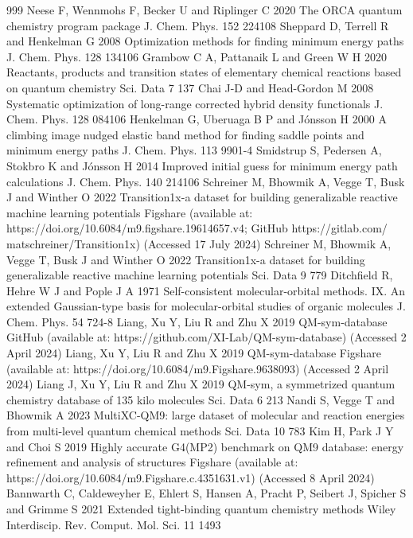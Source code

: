 \documentclass[12pt]{article}
\begin{document}
\begin{thebibliography}{999}
 Neese F, Wennmohs F, Becker U and Riplinger C 2020 The ORCA quantum chemistry program package J. Chem. Phys. 152 224108
 Sheppard D, Terrell R and Henkelman G 2008 Optimization methods for finding minimum energy paths J. Chem. Phys. 128 134106
 Grambow C A, Pattanaik L and Green W H 2020 Reactants, products and transition states of elementary chemical reactions based on quantum chemistry Sci. Data 7 137
 Chai J-D and Head-Gordon M 2008 Systematic optimization of long-range corrected hybrid density functionals J. Chem. Phys. 128 084106
 Henkelman G, Uberuaga B P and Jónsson H 2000 A climbing image nudged elastic band method for finding saddle points and minimum energy paths J. Chem. Phys. 113 9901-4
 Smidstrup S, Pedersen A, Stokbro K and Jónsson H 2014 Improved initial guess for minimum energy path calculations J. Chem. Phys. 140 214106
 Schreiner M, Bhowmik A, Vegge T, Busk J and Winther O 2022 Transition1x-a dataset for building generalizable reactive machine learning potentials Figshare (available at: https://doi.org/10.6084/m9.figshare.19614657.v4; GitHub https://gitlab.com/ matschreiner/Transition1x) (Accessed 17 July 2024)
 Schreiner M, Bhowmik A, Vegge T, Busk J and Winther O 2022 Transition1x-a dataset for building generalizable reactive machine learning potentials Sci. Data 9 779
 Ditchfield R, Hehre W J and Pople J A 1971 Self-consistent molecular-orbital methods. IX. An extended Gaussian-type basis for molecular-orbital studies of organic molecules J. Chem. Phys. 54 724-8
 Liang, Xu Y, Liu R and Zhu X 2019 QM-sym-database GitHub (available at: https://github.com/XI-Lab/QM-sym-database) (Accessed 2 April 2024)
 Liang, Xu Y, Liu R and Zhu X 2019 QM-sym-database Figshare (available at: https://doi.org/10.6084/m9.Figshare.9638093) (Accessed 2 April 2024)
 Liang J, Xu Y, Liu R and Zhu X 2019 QM-sym, a symmetrized quantum chemistry database of 135 kilo molecules Sci. Data 6 213
 Nandi S, Vegge T and Bhowmik A 2023 MultiXC-QM9: large dataset of molecular and reaction energies from multi-level quantum chemical methods Sci. Data 10 783
 Kim H, Park J Y and Choi S 2019 Highly accurate G4(MP2) benchmark on QM9 database: energy refinement and analysis of structures Figshare (available at: https://doi.org/10.6084/m9.Figshare.c.4351631.v1) (Accessed 8 April 2024)
 Bannwarth C, Caldeweyher E, Ehlert S, Hansen A, Pracht P, Seibert J, Spicher S and Grimme S 2021 Extended tight-binding quantum chemistry methods Wiley Interdiscip. Rev. Comput. Mol. Sci. 11 1493

\end{thebibliography}
\end{document}
